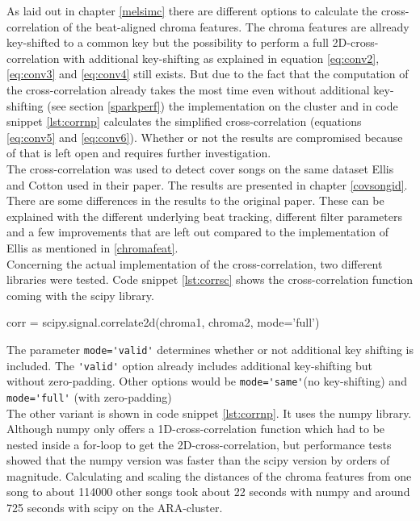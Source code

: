 As laid out in chapter \ref{melsimc} there are different options to calculate the cross-correlation of the beat-aligned chroma features. The chroma features are allready key-shifted to a common key but the possibility to perform a full 2D-cross-correlation with additional key-shifting as explained in equation \ref{eq:conv2}, \ref{eq:conv3} and \ref{eq:conv4} still exists. But due to the fact that the computation of the cross-correlation already takes the most time even without additional key-shifting (see section \ref{sparkperf}) the implementation on the cluster and in code snippet \ref{lst:corrnp} calculates the simplified cross-correlation (equations \ref{eq:conv5} and \ref{eq:conv6}). Whether or not the results are compromised because of that is left open and requires further investigation.\\
\noindent The cross-correlation was used to detect cover songs on the same dataset Ellis and Cotton used in their paper\cite{cover802}. The results are presented in chapter \ref{covsongid}. There are some differences in the results to the original paper. These can be explained with the different underlying beat tracking, different filter parameters and a few improvements that are left out compared to the implementation of Ellis \cite{cover802} as mentioned in \ref{chromafeat}.\\
Concerning the actual implementation of the cross-correlation, two different libraries were tested. Code snippet \ref{lst:corrsc} shows the cross-correlation function coming with the scipy library.

\begin{pythonCode}[frame=single,label={lst:corrsc},caption={cross-correlation scipy},captionpos=b]
corr = scipy.signal.correlate2d(chroma1, chroma2, mode='full')
\end{pythonCode}

\noindent The parameter \lstinline{mode='valid'} determines whether or not additional key shifting is included. The \lstinline{'valid'} option already includes additional key-shifting but without zero-padding. Other options would be \lstinline{mode='same'}(no key-shifting) and \lstinline{mode='full'} (with zero-padding)\\
\noindent The other variant is shown in code snippet \ref{lst:corrnp}. It uses the numpy library. Although numpy only offers a 1D-cross-correlation function which had to be nested inside a for-loop to get the 2D-cross-correlation, but performance tests showed that the numpy version was faster than the scipy version by orders of magnitude. Calculating and scaling the distances of the chroma features from one song to about 114000 other songs took about 22 seconds with numpy and around 725 seconds with scipy on the ARA-cluster. 

